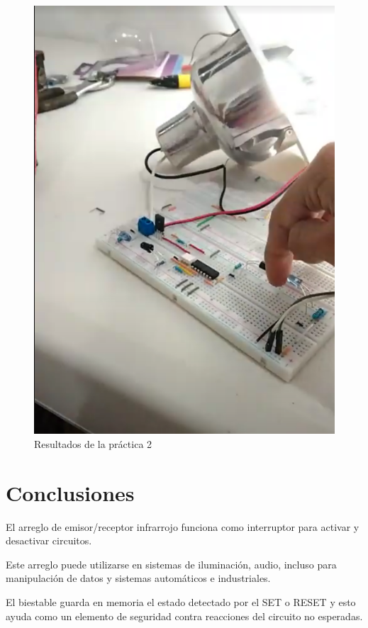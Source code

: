 \documentclass{article}
\begin{document}
\begin{figure}[h]
    \centering
    \includegraphics[scale=0.4]{Resultados2.png}
    \caption{Resultados de la práctica 2}
    \label{Fig: Resultados de la practica 2}
\end{figure}

\section{Conclusiones}
El arreglo de emisor/receptor infrarrojo funciona como interruptor para activar y desactivar circuitos.

Este arreglo puede utilizarse en sistemas de iluminación, audio, incluso para manipulación de datos y sistemas automáticos 
e industriales.

El biestable guarda en memoria el estado detectado por el SET o RESET y esto ayuda como un elemento de seguridad contra
reacciones del circuito no esperadas.




\printbibliography
\end{document}
